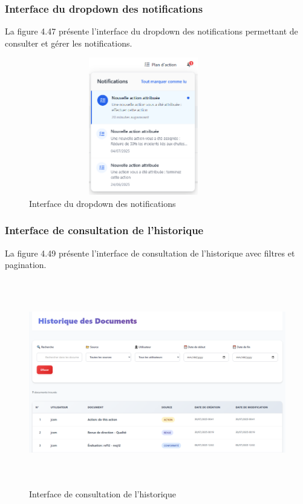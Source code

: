 \subsubsection{Interface du dropdown des notifications}
\noindent La figure 4.47 présente l'interface du dropdown des notifications permettant de consulter et gérer les notifications.

\begin{figure}[H]
    \centering
    \includegraphics[width=10cm,height=6cm]{images/notificationsdropdown.PNG}
    \caption{Interface du dropdown des notifications}
\end{figure}

\subsubsection{Interface de consultation de l'historique}
\noindent La figure 4.49 présente l'interface de consultation de l'historique avec filtres et pagination.

\begin{figure}[H]
    \centering
    \includegraphics[width=14cm,height=9cm]{images/historyinterface.PNG}
    \caption{Interface de consultation de l'historique}
\end{figure}


